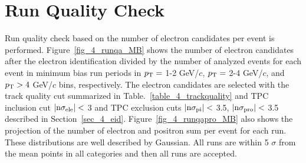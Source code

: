 




\section{Run Quality Check}
\label{sec_4_runselection}
Run quality check based on the number of electron candidates per event is performed. 
Figure~\ref{fig_4_runqa_MB} shows the number of electron candidates after the electron identification divided by the number of analyzed events for each event in minimum bias run periods in $p_{\rm{T}}=$ 1-2  GeV/$c$, $p_{\rm{T}}=$ 2-4 GeV/$c$, and $p_{\rm{T}}>4$ GeV/$c$ bins, respectively. 
The electron candidates are selected with the track quality cut summarized in Table.~\ref{table_4_trackquality} and TPC inclusion cut $|\rm{n}\sigma_{ele}| < $ 3 and TPC exclusion cuts $|\rm{n}\sigma_{pi}| < $ 3.5, $|\rm{n}\sigma_{pro}| < $ 3.5 described in Section~\ref{sec_4_eid}.
Figure~\ref{fig_4_runqapro_MB} also shows the projection of the number of electron and positron sum per event for each run. 
These distributions are well described by Gaussian.
All runs are within 5 $\sigma$ from the mean points in all categories and then all runs are accepted.  

